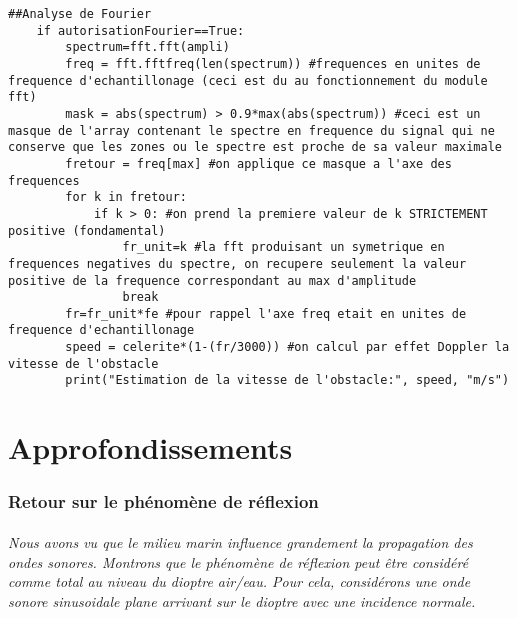 \documentclass[a4paper,11pt]{article}
\begin{document}
\begin{lstlisting}[mathescape]
##Analyse de Fourier
    if autorisationFourier==True:
        spectrum=fft.fft(ampli)
        freq = fft.fftfreq(len(spectrum)) #frequences en unites de frequence d'echantillonage (ceci est du au fonctionnement du module fft)
        mask = abs(spectrum) > 0.9*max(abs(spectrum)) #ceci est un masque de l'array contenant le spectre en frequence du signal qui ne conserve que les zones ou le spectre est proche de sa valeur maximale
        fretour = freq[max] #on applique ce masque a l'axe des frequences
        for k in fretour:
            if k > 0: #on prend la premiere valeur de k STRICTEMENT positive (fondamental)
                fr_unit=k #la fft produisant un symetrique en frequences negatives du spectre, on recupere seulement la valeur positive de la frequence correspondant au max d'amplitude
                break
        fr=fr_unit*fe #pour rappel l'axe freq etait en unites de frequence d'echantillonage
        speed = celerite*(1-(fr/3000)) #on calcul par effet Doppler la vitesse de l'obstacle
        print("Estimation de la vitesse de l'obstacle:", speed, "m/s")
\end{lstlisting} \newpage
\part{Approfondissements}
\setcounter{section}{0}
\section{Retour sur le ph\'{e}nom\`{e}ne de r\'{e}flexion}
\paragraph{\normalfont Nous avons vu que le milieu marin influence grandement la propagation des ondes sonores.\newline
Montrons que le ph\'{e}nom\`{e}ne de r\'{e}flexion peut \^{e}tre consid\'{e}r\'{e} comme total au niveau du dioptre air/eau. Pour cela, consid\'{e}rons une onde sonore sinusoidale plane arrivant sur le dioptre avec une incidence normale.}
\end{document}

